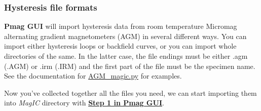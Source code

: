\documentclass[11pt]{book}
\begin{document}
{

\subsubsection{Hysteresis file formats}
{\bf Pmag GUI} will import hysteresis data from room temperature  Micromag alternating gradient magnetometers (AGM)  in several different ways.  You can import either hysteresis loops or backfield curves, or you can import whole directories of the same.  In the latter case, the file endings must be either .agm (.AGM) or .irm (.IRM) and the first part of the file must be the specimen name.
 See the documentation for  \href{#AGM\_magic.py}{AGM\_magic.py} for examples.


%
%
%

Now you've collected together all the files you need, we can start importing them into {\it MagIC} directory with   \href{#convert2magic}{\bf Step 1 in Pmag GUI}.


}
\end{document}
